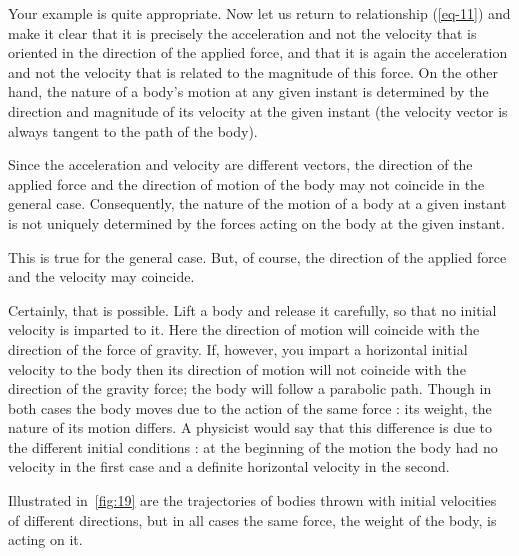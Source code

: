 \begin{p}
Your example is quite appropriate. Now let us return to relationship (\cref{eq-11}) and make it clear that it is precisely the acceleration and not the velocity that is oriented in the direction of the applied force, and that it is again the acceleration and not the velocity that is related to the magnitude of this force. On the other hand, the nature of a body's motion at any given instant is determined by the direction and magnitude of its velocity at the given instant (the velocity vector is always tangent to the path of the body).

Since the acceleration and velocity are different vectors, the direction of the applied force and the direction of motion of the body may not coincide in the general case. Consequently, the nature of the motion of a body at a given instant is not uniquely determined by the forces acting on the body at the given instant.
\end{p}


\begin{s}
This is true for the general case. But, of course, the direction of the applied force and the velocity may coincide.
\end{s}



\begin{p}
Certainly, that is possible. Lift a body and release it carefully, so that no initial velocity is imparted to it. Here the direction of motion will coincide with the direction of the force of gravity. If, however, you impart a horizontal initial velocity to the body then its direction of motion will not coincide with the direction of the gravity force; the body will follow a parabolic path. Though in both cases the body moves due to the action of the same force : its weight, the nature of its motion differs. A physicist would say that this difference is due to the different initial conditions : at the beginning of the motion the body had no velocity in the first case and a definite horizontal velocity in the second.

Illustrated in~\cref{fig:19} are the trajectories of bodies thrown with initial velocities of different directions, but in all cases the same force, the weight of the body, is acting on it.
\end{p}



